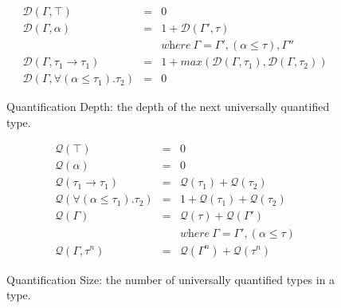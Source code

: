 \documentclass[runningheads]{llncs}
\begin{document}
\begin{figure}[t]
\begin{minipage}{\linewidth}
\[
\begin{array}{lcl}
\mathcal{D}(\Gamma, \top)
			& =
			& 0 \\
\mathcal{D}(\Gamma, \alpha)
			& =
			& 1 + \mathcal{D}(\Gamma', \tau) \\

			&
			& \textit{where}\ \Gamma = \Gamma', (\alpha \leqslant \tau), \Gamma'' \\
\mathcal{D}(\Gamma, \tau_1 \rightarrow \tau_1)
			& =
			& 1 + max(\mathcal{D}(\Gamma, \tau_1), \mathcal{D}(\Gamma, \tau_2)) \\
\mathcal{D}(\Gamma, \forall(\alpha \leqslant \tau_1).\tau_2)
			& =
			& 0
\end{array}
\]
\caption{Quantification Depth: the depth of the next universally quantified type.}
\label{f:quantDepth}
\end{minipage}
\end{figure}
\begin{figure}[t]
\begin{minipage}{\linewidth}
\[
\begin{array}{lcl}
\mathcal{Q}(\top)
			& =
			& 0 \\
\mathcal{Q}(\alpha)
			& =
			& 0 \\
\mathcal{Q}(\tau_1 \rightarrow \tau_1)
			& =
			& \mathcal{Q}(\tau_1) + \mathcal{Q}(\tau_2)  \\
\mathcal{Q}(\forall(\alpha \leqslant \tau_1).\tau_2)
			& =
			& 1 + \mathcal{Q}(\tau_1) + \mathcal{Q}(\tau_2)\\
\mathcal{Q}(\Gamma)
			& =
			& \mathcal{Q}(\tau) + \mathcal{Q}(\Gamma') \\

			&
			& \textit{where}\ \Gamma = \Gamma', (\alpha \leqslant \tau)\\
\mathcal{Q}(\Gamma, \tau^n)
			& =
			& \mathcal{Q}(\Gamma^n) + \mathcal{Q}(\tau^n)
			
\end{array}
\]
\caption{Quantification Size: the number of universally quantified types in a type.}
\label{f:quantSize}
\end{minipage}
\end{figure}
\end{document}
